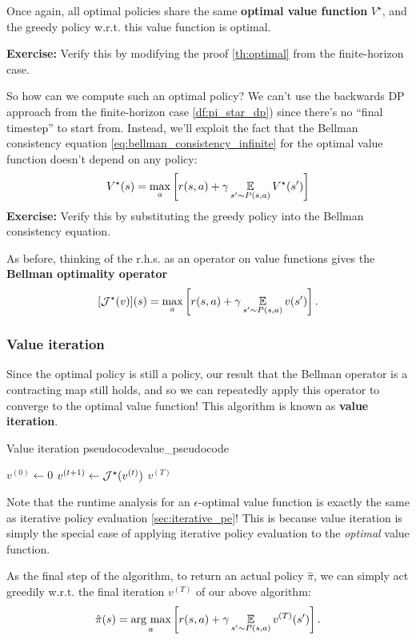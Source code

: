\documentclass[../main/main]{subfiles}
\begin{document}
Once again, all optimal policies share the same \textbf{optimal value function} $V^\star$, and the greedy policy w.r.t. this value function is optimal.

\textbf{Exercise:} Verify this by modifying the proof \ref{th:optimal} from the finite-horizon case.

So how can we compute such an optimal policy? We can't use the backwards DP approach from the finite-horizon case \eqref{df:pi_star_dp}) since there's no ``final timestep'' to start from. Instead, we'll exploit the fact that the Bellman consistency equation \eqref{eq:bellman_consistency_infinite} for the optimal value function doesn't depend on any policy:
\[
    V^\star(s) = \max_a \left[ r(s, a) + \gamma \operatorname*{\mathbb{E}}_{s' \sim P(s, a)} V^\star(s') \right]
\]
\textbf{Exercise:} Verify this by substituting the greedy policy into the Bellman consistency equation.

As before, thinking of the r.h.s. as an operator on value functions gives the \textbf{Bellman optimality operator}
\[
    [\mathcal{J}^{\star}(v)](s) = \max_a \left[ r(s, a) + \gamma \operatorname*{\mathbb{E}}_{s' \sim P(s, a)} v(s') \right].
\]

\subsubsection{Value iteration}

Since the optimal policy is still a policy, our result that the Bellman operator is a contracting map still holds, and so we can repeatedly apply this operator to converge to the optimal value function! This algorithm is known as \textbf{value iteration}.

\begin{definition}{Value iteration pseudocode}{value_pseudocode}
    \begin{algorithmic}
        \State $v^{(0)} \gets 0$
            \State $v^{(t+1)} \gets \mathcal{J}^{\star}(v^{(t)})$
        \EndFor
        \State \Return $v^{(T)}$
    \end{algorithmic}
\end{definition}

Note that the runtime analysis for an $\epsilon$-optimal value function is exactly the same as iterative policy evaluation \eqref{sec:iterative_pe}! This is because value iteration is simply the special case of applying iterative policy evaluation to the \emph{optimal} value function.

As the final step of the algorithm, to return an actual policy $\hat \pi$, we can simply act greedily w.r.t. the final iteration $v^{(T)}$ of our above algorithm:
\[
    \hat \pi(s) = \operatorname*{\textrm{arg\ max}}_a \left[ r(s, a) + \gamma \operatorname*{\mathbb{E}}_{s' \sim P(s, a)} v^{(T)}(s') \right].
\]
\end{document}
